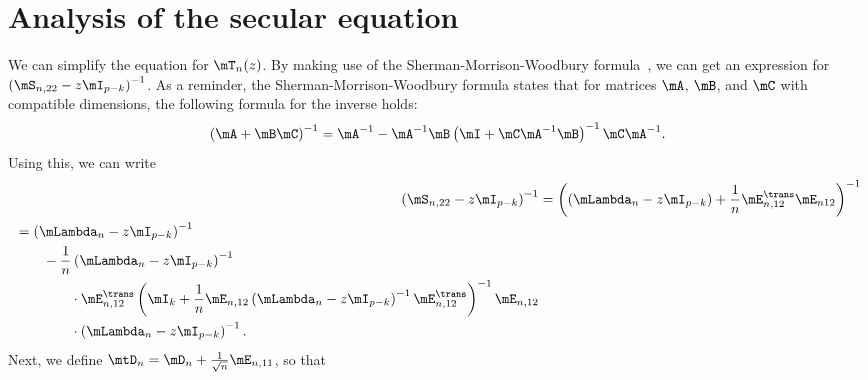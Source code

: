 \section{Analysis of the secular equation}\label{S:anal-sec-eqn}

We can simplify the equation for $\mT_n(z)$.  
By making use of the Sherman-Morrison-Woodbury formula~\cite{golub1996mc}, we can get an expression for $\left(\mS_{n,22} - z \mI_{p-k}\right)^{-1}$.  As a reminder, the Sherman-Morrison-Woodbury formula states that for matrices $\mA$, $\mB$, and $\mC$ with compatible dimensions, the following formula for the inverse holds:
\[
    \left(
        \mA
        +
        \mB
        \mC
    \right)^{-1}
        =
        \mA^{-1}
        -
        \mA^{-1}
        \mB
        \left(
            \mI
            +
            \mC
            \mA^{-1}
            \mB
        \right)^{-1}
        \mC
        \mA^{-1}.
\]
Using this, we can write
\begin{align}\label{E:lowrank-smw-expansion}
    \left(
        \mS_{n,22} - z \mI_{p-k}
    \right)^{-1}
        &=
            \left(
                \left(
                    \mLambda_n - z \mI_{p-k}
                \right)
                +
                \frac{1}{n}
                \mE_{n,12}^\trans \mE_{n12}
            \right)^{-1} \notag \\
        \begin{split}
        &=
            \left(
                \mLambda_n
                -
                z
                \mI_{p-k}
            \right)^{-1} \\
            &\qquad-
            \frac{1}{n}
            \left(
                \mLambda_n
                -
                z
                \mI_{p-k}
            \right)^{-1} \\
            &\qquad\qquad\cdot
            \mE_{n,12}^\trans
            \left(
                \mI_k
                +
                \frac{1}{n}
                \mE_{n,12}
                \left(
                    \mLambda_n
                    -
                    z
                    \mI_{p-k}
                \right)^{-1}
                \mE_{n,12}^\trans
            \right)^{-1}
            \mE_{n,12} \\
            &\qquad\qquad\cdot
            \left(
                \mLambda_n
                -
                z
                \mI_{p-k}
            \right)^{-1}.
    \end{split}
\end{align}
Next, we define $\mtD_n = \mD_n + \frac{1}{\sqrt{n}} \mE_{n,11}$, so that
